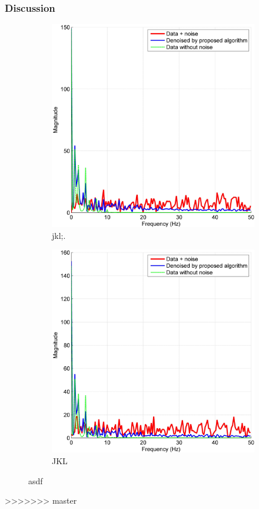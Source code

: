 \documentclass[onecolumn, groupedaddress, 10pt]{revtex4-1}
\begin{document}
\subsubsection{Discussion}
\begin{figure}[ht]
	\centering
	\begin{subfigure}{.5\textwidth}
  		\centering
  		\includegraphics[width=.9\linewidth]{denoise_1.jpg}
  		\caption{\label{fig:denoise_1} jkl;.}
	\end{subfigure}%
	\begin{subfigure}{.5\textwidth}
  		\centering
  		\includegraphics[width=.9\linewidth]{denoise_2.jpg}
  		\caption{\label{fig:denoise_2} JKL}
	\end{subfigure}
	\caption{asdf}
\end{figure}
>>>>>>> master
\end{document}
